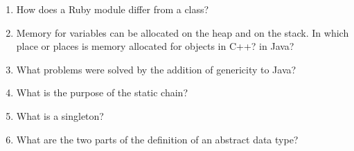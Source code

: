 \begin{enumerate}
  \item How does a Ruby module differ from a class?

  \item Memory for variables can be allocated on the heap
    and on the stack. In which place or places is memory
    allocated for objects in C++? in Java?

  \item What problems were solved by the addition
    of genericity to Java?

  \item What is the purpose of the static chain?

  \item What is a singleton?

  \item What are the two parts of the definition 
    of an abstract data type?

  \end{enumerate}


